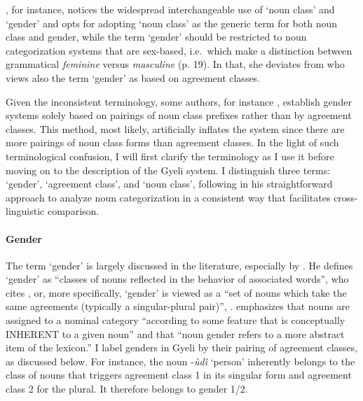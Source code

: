 \citet{aikhenvald2003}, for instance, notices the widespread interchangeable use of `noun class' and `gender' and opts for adopting `noun class' as the generic term for both noun class and gender, while the term `gender' should be restricted to noun categorization systems that are sex-based, i.e.\ which make a distinction between grammatical {\itshape feminine} versus {\itshape masculine} (p. 19). In that, she deviates from \citet{corbett91} who views also the term `gender' as based on agreement classes.

Given the inconsistent terminology, some authors, for instance \citet[85]{mve2011}, establish gender systems solely based on pairings of noun class prefixes rather than by agreement classes. This method, most likely, artificially inflates the system since there are more pairings of noun class forms than agreement classes.
In the light of such terminological confusion, I will first clarify the terminology as I use it before moving on to the description of the Gyeli system. I distinguish three terms: `gender', `agreement class', and `noun class', following \citet{guldemann2000} in his straightforward approach to analyze noun categorization in a consistent way that facilitates cross-linguistic comparison.

\paragraph{Gender} The term `gender' is largely discussed in the literature, especially by \citet{corbett91}. He defines `gender' as ``classes of nouns reflected in the behavior of associated words'', \citet[1]{corbett91} who cites \citet[231]{hockett58}, or, more specifically, `gender' is viewed as a ``set of nouns which take the same agreements (typically a singular-plural pair)'', \citet[45]{corbett91}. \citet[13]{guldemann2000} emphasizes that nouns are assigned to a nominal category ``according to some feature that is conceptually INHERENT to a  given noun'' and that ``noun gender refers to a more abstract item of the lexicon.'' I label genders in Gyeli by their pairing of agreement classes, as discussed below. For instance, the noun -{\itshape ùdì} `person' inherently belongs to the class of nouns that triggers agreement class 1 in its singular form and agreement class 2 for the plural. It therefore belongs to gender 1/2. 

